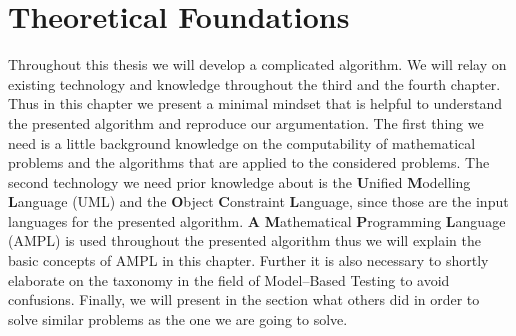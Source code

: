 \chapter{Theoretical Foundations}
Throughout this thesis we will develop a complicated algorithm. We will relay on existing technology and knowledge throughout the third and the fourth chapter. Thus in this chapter we present a minimal mindset that is helpful to understand the presented algorithm and reproduce our argumentation. The first thing we need is a little background knowledge on the computability of mathematical problems and the algorithms that are applied to the considered problems. The second technology we need prior knowledge about is the \textbf{U}nified \textbf{M}odelling \textbf{L}anguage (UML) and the \textbf{O}bject \textbf{C}onstraint \textbf{L}anguage, since those are the input languages for the presented algorithm. \textbf{A} \textbf{M}athematical \textbf{P}rogramming \textbf{L}anguage (AMPL) is used throughout the presented algorithm thus we will explain the basic concepts of AMPL in this chapter. Further it is also necessary to shortly elaborate on the taxonomy in the field of Model--Based Testing to avoid confusions. Finally, we will present in the section  what others did in order to solve similar problems as the one we are going to solve.
\label{chap:preliminaries}

